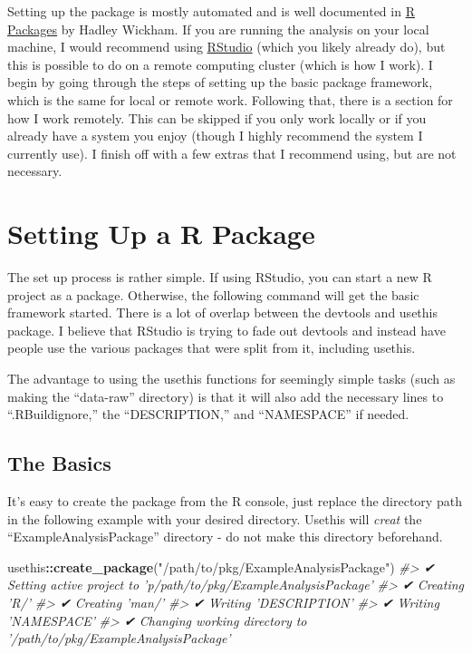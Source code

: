 \documentclass[]{book}
\newenvironment{Shaded}{\begin{snugshade}}{\end{snugshade}}
\newcommand{\KeywordTok}[1]{\textcolor[rgb]{0.13,0.29,0.53}{\textbf{#1}}}
\newcommand{\StringTok}[1]{\textcolor[rgb]{0.31,0.60,0.02}{#1}}
\newcommand{\CommentTok}[1]{\textcolor[rgb]{0.56,0.35,0.01}{\textit{#1}}}
\newcommand{\OperatorTok}[1]{\textcolor[rgb]{0.81,0.36,0.00}{\textbf{#1}}}
\newcommand{\NormalTok}[1]{#1}
\begin{document}
Setting up the package is mostly automated and is well documented in
\href{https://r-pkgs.org/index.html}{R Packages} by Hadley Wickham. If
you are running the analysis on your local machine, I would recommend
using \href{https://www.rstudio.com}{RStudio} (which you likely already
do), but this is possible to do on a remote computing cluster (which is
how I work). I begin by going through the steps of setting up the basic
package framework, which is the same for local or remote work. Following
that, there is a section for how I work remotely. This can be skipped if
you only work locally or if you already have a system you enjoy (though
I highly recommend the system I currently use). I finish off with a few
extras that I recommend using, but are not necessary.

\section{Setting Up a R Package}\label{setting-up-a-r-package}

The set up process is rather simple. If using RStudio, you can start a
new R project as a package. Otherwise, the following command will get
the basic framework started. There is a lot of overlap between the
devtools and usethis package. I believe that RStudio is trying to fade
out devtools and instead have people use the various packages that were
split from it, including usethis.

The advantage to using the usethis functions for seemingly simple tasks
(such as making the ``data-raw'' directory) is that it will also add the
necessary lines to ``.RBuildignore,'' the ``DESCRIPTION,'' and
``NAMESPACE'' if needed.

\subsection{The Basics}\label{the-basics}

It's easy to create the package from the R console, just replace the
directory path in the following example with your desired directory.
Usethis will \emph{creat} the ``ExampleAnalysisPackage'' directory - do
not make this directory beforehand.

\begin{Shaded}
\begin{Highlighting}[]
\NormalTok{usethis}\OperatorTok{::}\KeywordTok{create_package}\NormalTok{(}\StringTok{"/path/to/pkg/ExampleAnalysisPackage"}\NormalTok{)}
\CommentTok{#> ✔ Setting active project to 'p/path/to/pkg/ExampleAnalysisPackage'}
\CommentTok{#> ✔ Creating 'R/'}
\CommentTok{#> ✔ Creating 'man/'}
\CommentTok{#> ✔ Writing 'DESCRIPTION'}
\CommentTok{#> ✔ Writing 'NAMESPACE'}
\CommentTok{#> ✔ Changing working directory to '/path/to/pkg/ExampleAnalysisPackage'}
\end{Highlighting}
\end{Shaded}
\end{document}
